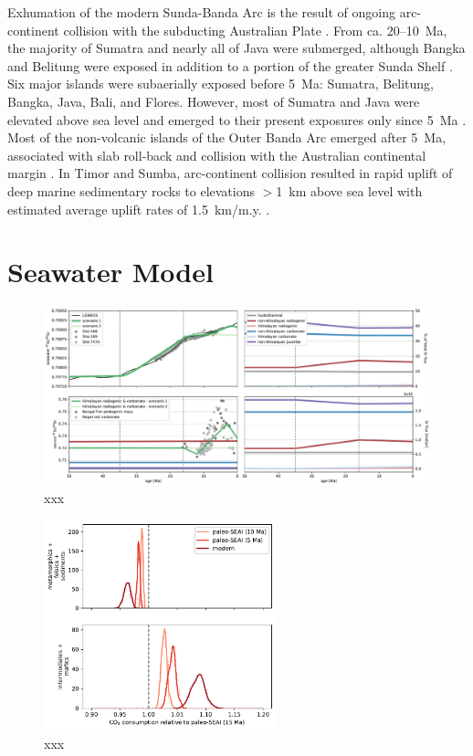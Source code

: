 \documentclass[11pt,letterpaper]{article}
\begin{document}
Exhumation of the modern Sunda-Banda Arc is the result of ongoing arc-continent collision with the subducting Australian Plate \citep{Harris2006a}. From ca. 20--10~Ma, the majority of Sumatra and nearly all of Java were submerged, although Bangka and Belitung were exposed in addition to a portion of the greater Sunda Shelf \citep{Hall2009a, Hall2013b}. Six major islands were subaerially exposed before 5~Ma: Sumatra, Belitung, Bangka, Java, Bali, and Flores. However, most of Sumatra and Java were elevated above sea level and emerged to their present exposures only since 5~Ma \citep{Hall2009a, Hall2013b}. Most of the non-volcanic islands of the Outer Banda Arc emerged after 5~Ma, associated with slab roll-back and collision with the Australian continental margin \citep{AudleyCharles2004a, Harris2006a, Hall2013b}. In Timor and Sumba, arc-continent collision resulted in rapid uplift of deep marine sedimentary rocks to elevations $>$1~km above sea level with estimated average uplift rates of 1.5~km/m.y. \citep{AudleyCharles1986a}.

\section*{Seawater Model}

\begin{figure}[h!]
    \centering
    \includegraphics[width=1\textwidth]{Figures/seawater_model.pdf}
    \caption{xxx}
    \label{fig:seawater_model}
\end{figure}

\begin{figure}[h!]
    \centering
    \includegraphics[width=0.6\textwidth]{Figures/lithology_CO2_consumption.pdf}
    \caption{xxx}
    \label{fig:lithology_CO2_consumption}
\end{figure}
\end{document}
